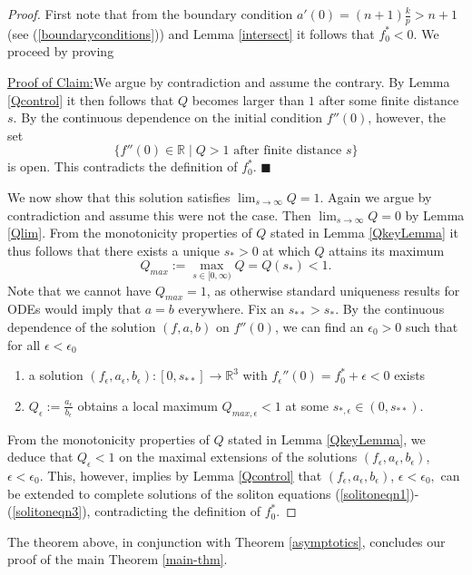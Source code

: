 \documentclass{amsart}
\theoremstyle{definition}
\theoremstyle{remark}
\numberwithin{equation}{section}
\newcommand{\R}{\mathbb{R}}  %
\newenvironment{claim}[1]{\par\noindent\underline{Claim:}\space#1}{}
\newenvironment{claimproof}[1]{\par\noindent\underline{Proof of Claim:}\space#1}{\hfill $\blacksquare$}
\begin{document}
\begin{proof}
First note that from the boundary condition $a'(0) = (n+1)\frac{k}{p} > n+1$ (see (\ref{boundaryconditions})) and Lemma \ref{intersect} it follows that $f^{\ast}_{0} < 0$. We proceed by proving
\vspace{1em}
\begin{claim}
 $f''(0)= f^{\ast}_0$ gives rise to a complete solution $(f, a, b): [0, \infty) \rightarrow \R^3$. 
\end{claim}
\vspace{0.5em}
\begin{claimproof}
We argue by contradiction and assume the contrary. By Lemma \ref{Qcontrol} it then follows that $Q$ becomes larger than $1$ after some finite distance $s$. By the continuous dependence on the initial condition $f''(0)$, however, the set
\begin{equation*}
\{f''(0) \in \mathbb{R} \;| \; Q > 1 \text{ after finite distance $s$} \}
\end{equation*}
is open. This contradicts the definition of $f^{\ast}_0$.
\end{claimproof}

 We now show that this solution satisfies $\lim_{s\rightarrow \infty} Q = 1$. Again we argue by contradiction and assume this were not the case. Then $\lim_{s\rightarrow \infty} Q = 0$ by Lemma \ref{Qlim}. From the monotonicity properties of $Q$ stated in Lemma \ref{QkeyLemma} it thus follows that there exists a unique $s_{\ast}>0$ at which $Q$ attains its maximum 
 $$Q_{max} := \max_{s\in[0,\infty)} Q = Q(s_{\ast}) < 1.$$ 
 Note that we cannot have $Q_{max} = 1$, as otherwise standard uniqueness results for ODEs would
 imply that $a = b$ everywhere. Fix an $s_{\ast\ast}> s_{\ast}$. 
 By the continuous dependence of the solution $(f,a,b)$ on $f''(0)$, we can find an $\epsilon_0 > 0$ 
 such that for all $\epsilon<\epsilon_0$ 
\begin{enumerate}
 \item a solution $(f_{\epsilon}, a_{\epsilon},b_{\epsilon}): [0,s_{\ast\ast}] \rightarrow \R^3$ 
 with $f_{\epsilon}''(0) = f^{\ast}_0 + \epsilon <0$ exists 

 \item $Q_{\epsilon} := \frac{a_{\epsilon}}{b_{\epsilon}}$ obtains 
 a local maximum $Q_{max,\epsilon} < 1$ at some $s_{\ast, \epsilon} \in (0,s_{\ast\ast})$. 
\end{enumerate}

From the monotonicity properties of $Q$ stated in Lemma \ref{QkeyLemma}, we deduce 
that $Q_{\epsilon} < 1$ on the maximal extensions of the solutions $(f_{\epsilon}, a_{\epsilon},b_{\epsilon})$, $\epsilon < \epsilon_0$. 
This, however, implies by Lemma \ref{Qcontrol} that $(f_{\epsilon}, a_{\epsilon},b_{\epsilon})$, $\epsilon < \epsilon_0,$ 
can be extended to complete solutions of the soliton equations (\ref{solitoneqn1})-(\ref{solitoneqn3}), contradicting the definition of $f^{\ast}_0$.
 
\end{proof}
The theorem above, in conjunction with Theorem \ref{asymptotics}, concludes our proof of the main Theorem \ref{main-thm}.
\end{document}
